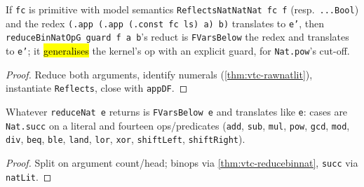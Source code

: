 \begin{lemma}
  \label{thm:vtc-reducebinnat}
  \leanok

   If \texttt{fc} is primitive with model semantics
  \texttt{ReflectsNatNatNat fc f} (resp.\ \texttt{...Bool}) and the redex
  \texttt{(.app (.app (.const fc ls) a) b)} translates to \texttt{e'}, then
  \texttt{reduceBinNatOpG guard f a b}'s reduct is \texttt{FVarsBelow} the redex and translates
  to \texttt{e'}; it \hl{generalises} the kernel's op with an explicit guard, for
  \texttt{Nat.pow}'s cut-off.
\end{lemma}
\begin{proof}
  \leanok
   Reduce both arguments, identify numerals (\ref{thm:vtc-rawnatlit}),
  instantiate \texttt{Reflects}, close with \texttt{appDF}.
\end{proof}

\begin{lemma}
  \label{thm:vtc-reducenat}
  \leanok

   Whatever \texttt{reduceNat e} returns is \texttt{FVarsBelow e} and translates
  like \texttt{e}: cases are \texttt{Nat.succ} on a literal and fourteen ops/predicates
  (\texttt{add}, \texttt{sub}, \texttt{mul}, \texttt{pow}, \texttt{gcd}, \texttt{mod},
  \texttt{div}, \texttt{beq}, \texttt{ble}, \texttt{land}, \texttt{lor}, \texttt{xor},
  \texttt{shiftLeft}, \texttt{shiftRight}).
\end{lemma}
\begin{proof}
  \leanok
   Split on argument count/head; binops via \ref{thm:vtc-reducebinnat},
  \texttt{succ} via \texttt{natLit}.
\end{proof}

